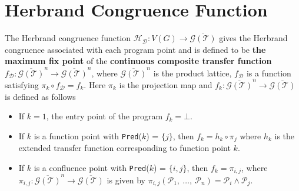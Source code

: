 \section{Herbrand Congruence Function}
\label{sec:HerbrandCongruenceFunction}
The Herbrand congruence function 
$\mathcal H_{\mathcal D} : V(G) \to \overline{\mathcal G(\mathcal T)}$ 
gives the Herbrand congruence associated with each program point and 
is defined to be \textbf{the maximum fix point} of the \textbf{continuous
composite transfer function} 
$f_{\mathcal D} : \overline{\mathcal G(\mathcal T)}^n \to \overline{\mathcal G(\mathcal T)}^n$, 
where $\overline{\mathcal G(\mathcal T)}^n$ is the product lattice, 
$f_{\mathcal D}$ is a function satisfying $\pi_k \circ f_{\mathcal D} = f_k$. Here $\pi_k$ is the projection map
and $f_k : \overline{\mathcal G(\mathcal T)}^n \to \overline{\mathcal G(\mathcal T)}$ 
is defined as follows 
\begin{itemize} \tightlist
    \item   If $k = 1$, the entry point of the program $f_k = \bot$.
    \item   If $k$ is a function point with \texttt{Pred}($k$) = $\{j\}$, then 
    $f_k = h_k \circ \pi_j$ where $h_k$ is the extended transfer function 
    corresponding to function point $k$.
    \item   If $k$ is a confluence point with \texttt{Pred}($k$) = $\{i, j\}$, 
    then $f_k = \pi_{i, j}$, where $\pi_{i, j}:\overline{\mathcal G(\mathcal T)}^n \to \overline{\mathcal G(\mathcal T)}$ 
    is given by $\pi_{i,j}(\mathcal P_1,\ \dots,\ \mathcal P_n) = \mathcal P_i \land \mathcal P_j$.
\end{itemize}
